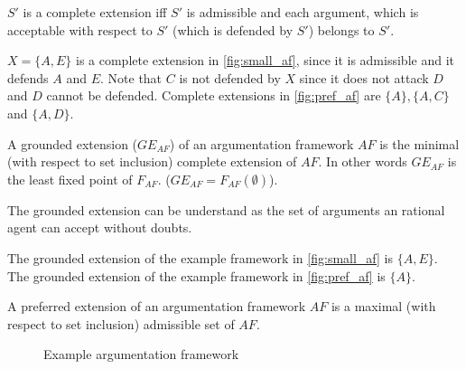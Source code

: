\begin{definition}
$S'$ is a complete extension iff  $S'$ is admissible and each argument, which is acceptable with respect to $S'$ (which is defended by $S'$) belongs to $S'$.
\end{definition}

\begin{exa}
$X = \{A, E\}$ is a complete extension in \autoref{fig:small_af}, since it is admissible and it defends $A$ and $E$. Note that $C$ is not defended by $X$ since it does not attack $D$ and $D$ cannot be defended.
Complete extensions in \autoref{fig:pref_af} are $\{A\}, \{A, C\}$ and $\{A, D\}$.
\end{exa}


\begin{definition}
A grounded extension ($GE_{AF}$) of an argumentation framework $AF$ is the minimal (with respect to set inclusion) complete extension of $AF$. In other words $GE_{AF}$ is the least fixed point of $F_{AF}$. ($GE_{AF} = F_{AF}(\emptyset)$).
\end{definition}

\begin{remark}
	The grounded extension can be understand as the set of arguments an rational agent can accept without doubts. 
\end{remark}

\begin{exa}
	The grounded extension of the example framework in \autoref{fig:small_af} is $\{A, E\}$.
	The grounded extension of the example framework in \autoref{fig:pref_af} is $\{A\}$.
\end{exa}


\begin{definition}
A preferred extension of an argumentation framework $AF$ is a maximal (with respect to set inclusion) admissible set of $AF$.
\end{definition}

\begin{figure}[t]
\centering
{}
\caption{Example argumentation framework}
\label{fig:pref_af}
\end{figure}

